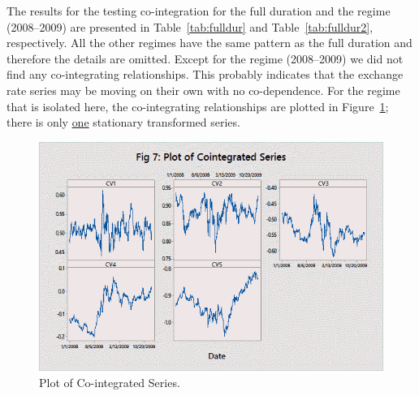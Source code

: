 The results for the testing co-integration for the full duration and the regime (2008--2009) are presented in Table~\ref{tab:fulldur} and Table~\ref{tab:fulldur2}, respectively. All the other regimes have the same pattern as the full duration and therefore the details are omitted. Except for the regime (2008--2009) we did not find any co-integrating relationships. This probably indicates that the exchange rate series may be moving on their own with no co-dependence. For the regime that is isolated here, the co-integrating relationships are plotted in Figure~\ref{fig:cointser}; there is only \underline{one} stationary transformed series.

	\begin{figure}[!ht]
	\centering
	\includegraphics[width=\textwidth]{chapters/chapter_mvts/figures/pcointser.png}
	\caption{Plot of Co-integrated Series. \label{fig:cointser}}
	\end{figure}
	
